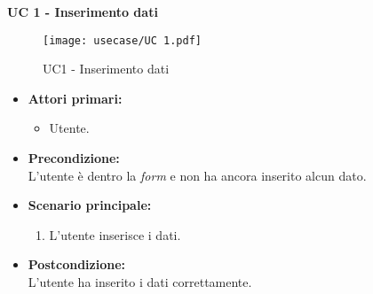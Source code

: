 \noindent \textbf{\large UC 1 - Inserimento dati}
\label{uc:inserimento-dati}
\begin{figure}[!h] 
    \centering 
    \texttt{[image: usecase/UC 1.pdf]} 
    \caption{UC1 - Inserimento dati}
\end{figure}
\begin{itemize}

	\item \textbf{Attori primari: }
		\begin{itemize}
			\item Utente.
		\end{itemize}

	\item \textbf{Precondizione: }\\[0.3cm]
		L'utente è dentro la \textit{form} e non ha ancora inserito alcun dato.

	\item \textbf{Scenario principale: }
		\begin{enumerate}
			\item L'utente inserisce i dati.
		\end{enumerate}
		

	\item \textbf{Postcondizione: }\\[0.3cm]
		L'utente ha inserito i dati correttamente.

\end{itemize}

\vspace{0.4cm}

